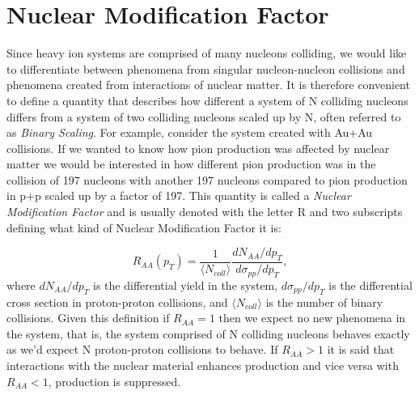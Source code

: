 \chapter{Nuclear Modification Factor} %
\label{nuclmodfactapp}

Since heavy ion systems are comprised of many nucleons colliding, we would like to differentiate between phenomena from singular nucleon-nucleon collisions and phenomena created from interactions of nuclear matter. It is therefore convenient to define a quantity that describes how different a system of N colliding nucleons differs from a system of two colliding nucleons scaled up by N, often referred to as \textit{Binary Scaling}. For example, consider the system created with Au+Au collisions. If we wanted to know how pion production was affected by nuclear matter we would be interested in how different pion production was in the collision of 197 nucleons with another 197 nucleons compared to pion production in p+p scaled up by a factor of 197. This quantity is called a \textit{Nuclear Modification Factor} and is usually denoted with the letter R and two subscripts defining what kind of Nuclear Modification Factor it is:

\begin{equation}
R_{AA}(p_{T}) = \frac{1}{\langle N_{coll} \rangle} \frac{dN_{AA}/dp_{T}}{d\sigma_{pp}/dp_{T}},
\end{equation}
where $dN_{AA}/dp_{T}$ is the differential yield in the system, $d\sigma_{pp}/dp_{T}$ is the differential cross section in proton-proton collisions, and $\langle N_{coll} \rangle$ is the number of binary collisions. Given this definition if $R_{AA}=1$ then we expect no new phenomena in the system, that is, the system comprised of N colliding nucleons behaves exactly as we'd expect N proton-proton collisions to behave. If $R_{AA}>1$ it is said that interactions with the nuclear material enhances production and vice versa with $R_{AA}<1$, production is suppressed.